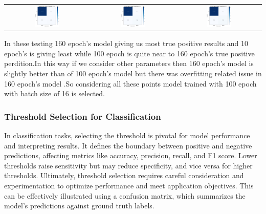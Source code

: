 \documentclass[12pt,a4paper]{report}
\begin{document}
		    \begin{tabular}{c c c}
 \includegraphics[width=0.31\textwidth]{10cf}&
 \includegraphics[width=0.31\textwidth]{100cf}&
 \includegraphics[width=0.31\textwidth]{160cf}
    \end{tabular}
    In these testing 160 epoch's model giving us most true positive results and 10 epoch's is giving least while 100 epoch is quite near to 160 epoch's true positive perdition.In this way if we consider other parameters then 160 epoch's model is slightly better than of 100 epoch's model but there was overfitting related issue in 160 epoch's model .So considering all these points model trained with 100 epoch with batch size of 16 is selected.\\   
    
    
    \subsubsection{Threshold Selection for Classification}
    
In classification tasks, selecting the threshold is pivotal for model performance and interpreting results. It defines the boundary between positive and negative predictions, affecting metrics like accuracy, precision, recall, and F1 score. Lower thresholds raise sensitivity but may reduce specificity, and vice versa for higher thresholds.
 Ultimately, threshold selection requires careful consideration and experimentation to optimize performance and meet application objectives. This can be effectively illustrated using a confusion matrix, which summarizes the model's predictions against ground truth labels.
 
\end{document}
